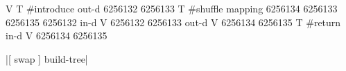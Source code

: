 \centering

  \begin{factorcode}
    V{
        T{ #introduce { out-d { 6256132 6256133 } } }
        T{ #shuffle
            { mapping { { 6256134 6256133 } { 6256135 6256132 } } }
            { in-d V{ 6256132 6256133 } }
            { out-d V{ 6256134 6256135 } }
        }
        T{ #return { in-d V{ 6256134 6256135 } } }
    }
  \end{factorcode}

\caption{\factor|[ swap ] build-tree|}
